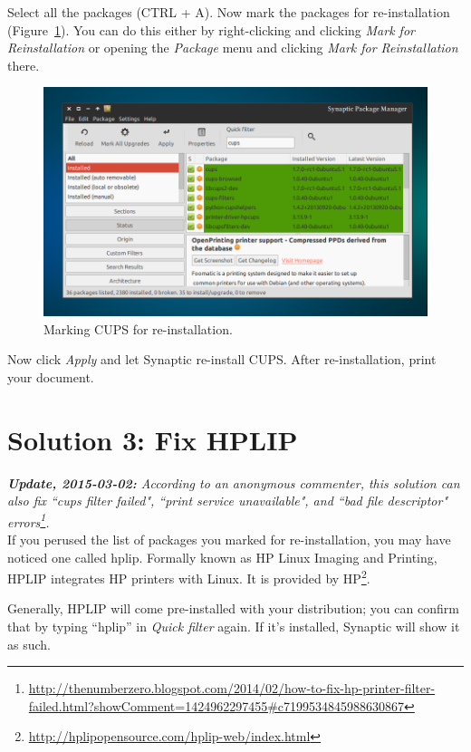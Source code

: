 \documentclass[12pt, a4paper]{article}
\begin{document}
\noindent Select all the packages (CTRL + A). Now mark the packages for re-installation (Figure~\ref{fig8}). You can do this either by right-clicking and clicking \emph{Mark for Reinstallation} or opening the \emph{Package} menu and clicking \emph{Mark for Reinstallation} there.

\begin{figure}[!hbp]
  \centering
  \includegraphics[width=1\textwidth]{imgs/Filter_failed_8.png}
  \caption{Marking CUPS for re-installation.}
  \label{fig8}
\end{figure}

\noindent Now click \emph{Apply} and let Synaptic re-install CUPS. After re-installation, print your document.

\section*{Solution 3: Fix HPLIP}

\emph{\textbf{Update, 2015-03-02:} According to an anonymous commenter, this solution can also fix ``cups filter failed", ``print service unavailable", and ``bad file descriptor" errors\footnote{\url{http://thenumberzero.blogspot.com/2014/02/how-to-fix-hp-printer-filter-failed.html?showComment=1424962297455\#c7199534845988630867}}.}\\

\noindent If you perused the list of packages you marked for re-installation, you may have noticed one called hplip. Formally known as HP Linux Imaging and Printing, HPLIP integrates HP printers with Linux. It is provided by HP\footnote{\url{http://hplipopensource.com/hplip-web/index.html}}.

Generally, HPLIP will come pre-installed with your distribution; you can confirm that by typing “hplip” in \emph{Quick filter} again. If it's installed, Synaptic will show it as such.
\end{document}
